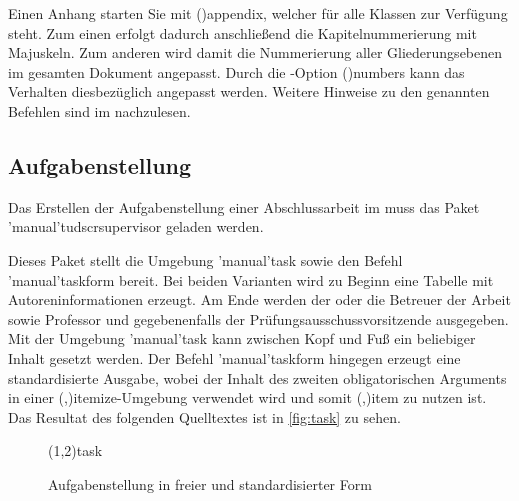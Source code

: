 \documentclass[%
  english,ngerman,%
  cdgeometry=no,DIV=12,%
  cd=false,cdfont=false,cdtitle=true,%
  headings=normal,%
  automark,%
  listof=toc,%
]{tudscrartcl}
\begin{document}
Einen Anhang starten Sie mit \Macro(){appendix}, welcher 
für alle Klassen zur Verfügung steht. Zum einen erfolgt dadurch anschließend 
die Kapitelnummerierung mit Majuskeln. Zum anderen wird damit die Nummerierung 
aller Gliederungsebenen im gesamten Dokument angepasst. Durch die 
\KOMAScript-Option \Option(){numbers} kann das Verhalten 
diesbezüglich angepasst werden. Weitere Hinweise zu den genannten Befehlen sind 
im \scrguide nachzulesen.


\subsection{%
  Aufgabenstellung%
  \label{sec:task}%
}

Das Erstellen der Aufgabenstellung einer Abschlussarbeit im \TUDCD muss das 
Paket \Package'manual'{tudscrsupervisor} geladen werden.
%
\begin{Preamble}
\usepackage{tudscrsupervisor}

\end{Preamble}
%
Dieses Paket stellt die Umgebung \Environment'manual'{task} sowie den Befehl 
\Macro'manual'{taskform} bereit. Bei beiden Varianten wird zu Beginn eine 
Tabelle mit Autoreninformationen erzeugt. Am Ende werden der oder die Betreuer 
der Arbeit sowie Professor und gegebenenfalls der Prüfungsausschussvorsitzende 
ausgegeben. Mit der Umgebung \Environment'manual'{task} kann zwischen Kopf und 
Fuß ein beliebiger Inhalt gesetzt werden. Der Befehl \Macro'manual'{taskform} 
hingegen erzeugt eine standardisierte Ausgabe, wobei der Inhalt des zweiten 
obligatorischen Arguments in einer 
\Environment(,){itemize}-Umgebung 
verwendet wird und somit \Macro(,){item}
zu nutzen ist. Das Resultat des folgenden Quelltextes ist in \autoref{fig:task} 
zu sehen. 
%
\begin{figure}
\IncludeStandalone(1,2){task}
\caption{%
  Aufgabenstellung in freier und standardisierter Form%
  \label{fig:task}%
}
\end{figure}
\end{document}
